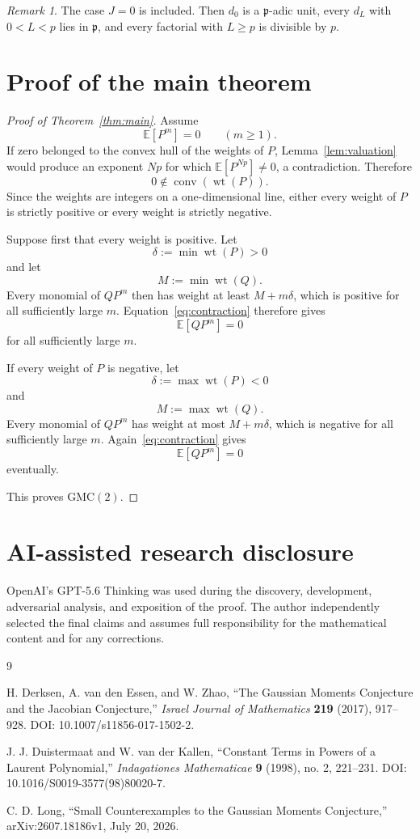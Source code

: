 \documentclass[11pt]{article}
\theoremstyle{remark}
\newtheorem{remark}[theorem]{Remark}
\newcommand{\E}{\mathbb E}
\newcommand{\wt}{\operatorname{wt}}
\newcommand{\conv}{\operatorname{conv}}
\begin{document}
\begin{remark}
The case $J=0$ is included. Then $d_0$ is a $\mathfrak p$-adic unit, every $d_L$ with $0<L<p$ lies in $\mathfrak p$, and every factorial with $L\ge p$ is divisible by $p$.
\end{remark}

\section{Proof of the main theorem}

\begin{proof}[Proof of Theorem~\ref{thm:main}]
Assume
\[
\E[P^m]=0
\qquad(m\ge1).
\]
If zero belonged to the convex hull of the weights of $P$, Lemma~\ref{lem:valuation} would produce an exponent $Np$ for which $\E[P^{Np}]\ne0$, a contradiction. Therefore
\begin{equation}\label{eq:nozero}
0\notin\conv(\wt(P)).
\end{equation}
Since the weights are integers on a one-dimensional line, either every weight of $P$ is strictly positive or every weight is strictly negative.

Suppose first that every weight is positive. Let
\[
\delta:=\min\wt(P)>0
\]
and let
\[
M:=\min\wt(Q).
\]
Every monomial of $QP^m$ then has weight at least $M+m\delta$, which is positive for all sufficiently large $m$. Equation~\eqref{eq:contraction} therefore gives
\[
\E[QP^m]=0
\]
for all sufficiently large $m$.

If every weight of $P$ is negative, let
\[
\delta:=\max\wt(P)<0
\]
and
\[
M:=\max\wt(Q).
\]
Every monomial of $QP^m$ has weight at most $M+m\delta$, which is negative for all sufficiently large $m$. Again~\eqref{eq:contraction} gives
\[
\E[QP^m]=0
\]
eventually.

This proves $\mathrm{GMC}(2)$.
\end{proof}

\section*{AI-assisted research disclosure}

OpenAI's GPT-5.6 Thinking was used during the discovery, development, adversarial analysis, and exposition of the proof. The author independently selected the final claims and assumes full responsibility for the mathematical content and for any corrections.

\begin{thebibliography}{9}

H. Derksen, A. van den Essen, and W. Zhao,
``The Gaussian Moments Conjecture and the Jacobian Conjecture,''
\emph{Israel Journal of Mathematics} \textbf{219} (2017), 917--928.
DOI: 10.1007/s11856-017-1502-2.

J. J. Duistermaat and W. van der Kallen,
``Constant Terms in Powers of a Laurent Polynomial,''
\emph{Indagationes Mathematicae} \textbf{9} (1998), no. 2, 221--231.
DOI: 10.1016/S0019-3577(98)80020-7.

C. D. Long,
``Small Counterexamples to the Gaussian Moments Conjecture,''
arXiv:2607.18186v1, July 20, 2026.

\end{thebibliography}
\end{document}
